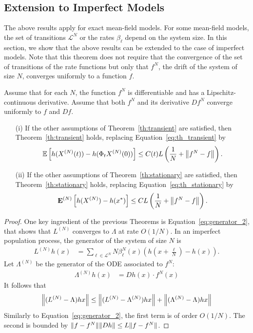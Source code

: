\documentclass[acmlarge]{acmart}
\newcommand\XN{X^{(N)}}
\newcommand\LN{L^{(N)}}
\newcommand\calL{\mathcal{L}}
\newcommand\esp[1]{{\mathchoice{\besp{#1}}{\sesp{#1}}{\sesp{#1}}{\sesp{#1}}}}
\newcommand\besp[1]{\mathbb{E}\left[#1\right]}
\newcommand\sesp[1]{\mathbb{E}[#1]}
\newcommand\espN[1]{{\mathchoice{\bespN{#1}}{\sespN{#1}}{\sespN{#1}}{\sespN{#1}}}}
\newcommand\bespN[1]{\mathbf{E}^{(N)}\left[#1\right]}
\newcommand\sespN[1]{\mathbf{E}^{(N)}[#1]}
\newcommand\norm[1]{{\mathchoice{\bnorm{#1}}{\snorm{#1}}{\snorm{#1}}{\snorm{#1}}}}
\newcommand\bnorm[1]{\left\|#1\right\|}
\newcommand\snorm[1]{\|#1\|}
\newcommand\p[1]{\left(#1\right)}
\begin{document}
\subsection{Extension to Imperfect Models}

The above results apply for exact mean-field models. For some
mean-field models, the set of transitions $\calL^N$ or the rates
$\beta_\ell$ depend on the system size. In this section, we show that
the above results can be extended to the case of imperfect models.
Note that this theorem does not require that the convergence of the
set of transitions of the rate functions but only that $f^N$, the
drift of the system of size $N$, converges uniformly to a function
$f$.

\begin{theorem}\label{th:imperfect}
  Assume that for each $N$, the function $f^N$ is differentiable and
  has a Lipschitz-continuous derivative. Assume that both $f^N$ and
  its derivative $Df^N$ converge uniformly to $f$ and $Df$. 
  \begin{itemize}
  \item[(i)] If the other assumptions of Theorem~\ref{th:transient}
    are satisfied, then Theorem~\ref{th:transient} holds, replacing
    Equation~\eqref{eq:th_transient} by
    \begin{align*}
      \esp{h(\XN(t)) - h(\Phi_t\XN(0))} %
      \le C(t)L\p{\frac{1}{N} + \norm{f^N-f}}. 
    \end{align*}
  \item[(ii)] If the other assumptions of Theorem~\ref{th:stationary}
    are satisfied, then Theorem~\ref{th:stationary} holds, replacing
    Equation~\eqref{eq:th_stationary} by
    \begin{align*}
      \espN{h(\XN)-h(x^*)} \le CL\p{\frac{1}{N} +
      \norm{f^N-f}}.
    \end{align*}
  \end{itemize}
\end{theorem}
\begin{proof}
  \newcommand\LNN{\widetilde{L}^{(N)}}
  \newcommand\LambdaN{\Lambda^{(N)}}
  
  One key ingredient of the previous Theorems is
  Equation~\eqref{eq:generator_2}, that shows that $\LN$ converges to
  $\Lambda$ at rate $O(1/N)$. In an imperfect population process, the
  generator of the system of size $N$ is
  \begin{align*}
    \LN h (x) &= \sum_{\ell\in\calL^N} N\beta^N_\ell(x) ( h(x+\frac{\ell}{N})-h(x) ).
  \end{align*}
  Let $\LambdaN$ be the generator of the ODE associated to $f^N$: 
  \begin{align*}
    \LambdaN h (x) &= D h(x) \cdot f^N(x)
  \end{align*}
  It follows that 
  \begin{align*}
    \norm{(\LN-\Lambda)hx} \le \norm{(\LN-\LambdaN)hx} +
    \norm{(\LambdaN-\Lambda)hx}
  \end{align*}
  Similarly to Equation~\eqref{eq:generator_2}, the first term is of
  order $O(1/N)$. The second is bounded by $\norm{f-f^N}\norm{Dh}\le
  L\norm{f-f^N}$. 
\end{proof}
\end{document}
